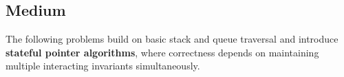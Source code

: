 \subsection{Medium}

The following problems build on basic stack and queue traversal and introduce \textbf{stateful pointer algorithms}, where correctness depends on maintaining multiple interacting invariants simultaneously.




